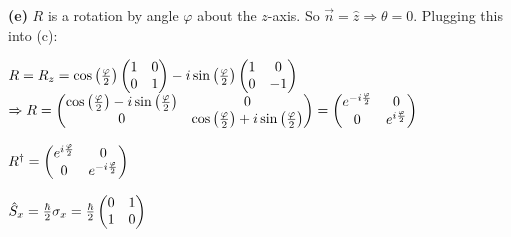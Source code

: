 \documentclass[14pt]{extarticle}
\makeatletter
\newenvironment{lefteqs}{%
    \begin{flushleft}%
    \renewcommand{\arraystretch}{1.3}%
    $\begin{array}{@{}l@{}}%
}{%
    \end{array}$%
    \end{flushleft}%
}
\makeatother
\begin{document}
\textbf{(e)} \quad $R$ is a rotation by angle $\varphi$ about the $z$-axis.
So $\vec{n} = \hat{z} \Rightarrow \theta = 0$. Plugging this into (c):
\begin{lefteqs}
    R = R_z = \cos\left(\frac{\varphi}{2}\right) \begin{pmatrix} 1 & 0 \\ 0 & 1 \end{pmatrix}
    - i \sin\left(\frac{\varphi}{2}\right) \begin{pmatrix} 1 & 0 \\ 0 & -1 \end{pmatrix} \\
    \Rightarrow R = \begin{pmatrix} \cos\left(\frac{\varphi}{2}\right) - i \sin\left(\frac{\varphi}{2}\right) & 0 \\ 0 & \cos\left(\frac{\varphi}{2}\right) + i \sin\left(\frac{\varphi}{2}\right) \end{pmatrix}
    = \begin{pmatrix} e^{-i\frac{\varphi}{2}} & 0 \\ 0 & e^{i\frac{\varphi}{2}} \end{pmatrix}
\end{lefteqs}
\begin{lefteqs}
    R^\dagger = \begin{pmatrix} e^{i\frac{\varphi}{2}} & 0 \\ 0 & e^{-i\frac{\varphi}{2}} \end{pmatrix}
\end{lefteqs}
\begin{lefteqs}
    \hat{S}_x = \frac{\hbar}{2} \sigma_x = \frac{\hbar}{2} \begin{pmatrix} 0 & 1 \\ 1 & 0 \end{pmatrix}
\end{lefteqs}
\end{document}

